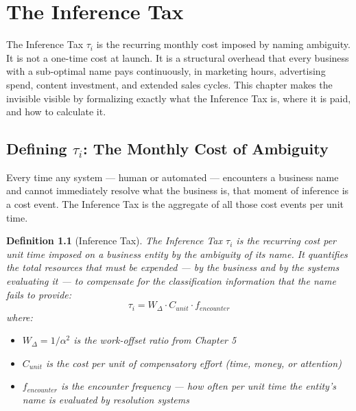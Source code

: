 \documentclass[12pt, openany]{book}
\theoremstyle{thmstyle}
\theoremstyle{defstyle}
\newtheorem{definition}{Definition}[chapter]
\newcommand{\taui}{\tau_i}
\begin{document}
\chapter{The Inference Tax}

\begin{keybox}
The Inference Tax $\taui$ is the recurring monthly cost imposed by naming ambiguity. It is not a one-time cost at launch. It is a structural overhead that every business with a sub-optimal name pays continuously, in marketing hours, advertising spend, content investment, and extended sales cycles. This chapter makes the invisible visible by formalizing exactly what the Inference Tax is, where it is paid, and how to calculate it.
\end{keybox}

\section{Defining $\tau_i$: The Monthly Cost of Ambiguity}

Every time any system --- human or automated --- encounters a business name and cannot immediately resolve what the business is, that moment of inference is a cost event. The Inference Tax is the aggregate of all those cost events per unit time.

\begin{definition}[Inference Tax]
The Inference Tax $\taui$ is the recurring cost per unit time imposed on a business entity by the ambiguity of its name. It quantifies the total resources that must be expended --- by the business and by the systems evaluating it --- to compensate for the classification information that the name fails to provide:
\begin{equation}
\tau_i = W_\Delta \cdot C_{unit} \cdot f_{encounter}
\label{eq:inference_tax}
\end{equation}
where:
\begin{itemize}[leftmargin=1.5em]
  \item $W_\Delta = 1/\alpha^2$ is the work-offset ratio from Chapter 5
  \item $C_{unit}$ is the cost per unit of compensatory effort (time, money, or attention)
  \item $f_{encounter}$ is the encounter frequency --- how often per unit time the entity's name is evaluated by resolution systems
\end{itemize}
\end{definition}
\end{document}
